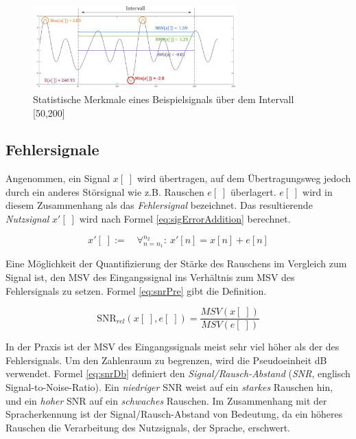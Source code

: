 \begin{figure}[h]
	\centering
	\includegraphics[width=0.7\textwidth]{bilder/sigStats02.png}
	\caption{Statistische Merkmale eines Beispielsignals über dem Intervall [50,200]}
	\label{img:sigStats}
\end{figure}

\subsection{Fehlersignale}


Angenommen, ein Signal $x[\;]$ wird übertragen, auf dem Übertragungsweg jedoch durch ein anderes Störsignal wie z.B. Rauschen $e[\;]$ überlagert. $e[\;]$ wird in diesem Zusammenhang als das \emph{Fehlersignal} bezeichnet. Das resultierende \emph{Nutzsignal} $x'[\;]$ wird nach Formel \ref{eq:sigErrorAddition} berechnet. 

\begin{equation}
x'[\;] := \quad \mathop{\forall}_{n = n_1}^{n_2} :\ x'[n] = x[n] + e[n]
\label{eq:sigErrorAddition}
\end{equation}

Eine Möglichkeit der Quantifizierung der Stärke des Rauschens im Vergleich zum Signal ist, den MSV des Eingangssignal ins Verhältnis zum MSV des Fehlersignals zu setzen. Formel \ref{eq:snrPre} gibt die Definition.


\begin{equation}
\text{SNR}_{rel}(x[\;],e[\;]) = \frac{MSV(x[\;])}{MSV(e[\;])}
\label{eq:snrPre}
\end{equation}

In der Praxis ist der MSV des Eingangssignals meist sehr viel höher als der des Fehlersignals. Um den Zahlenraum zu begrenzen, wird die Pseudoeinheit dB verwendet. Formel \ref{eq:snrDb} definiert den \emph{Signal/Rausch-Abstand} (\emph{SNR}, englisch Signal-to-Noise-Ratio). Ein \emph{niedriger} SNR weist auf ein \emph{starkes} Rauschen hin, und ein \emph{hoher} SNR auf ein \emph{schwaches} Rauschen. Im Zusammenhang mit der Spracherkennung ist der Signal/Rausch-Abstand von Bedeutung, da ein höheres Rauschen die Verarbeitung des Nutzsignals, der Sprache, erschwert.

